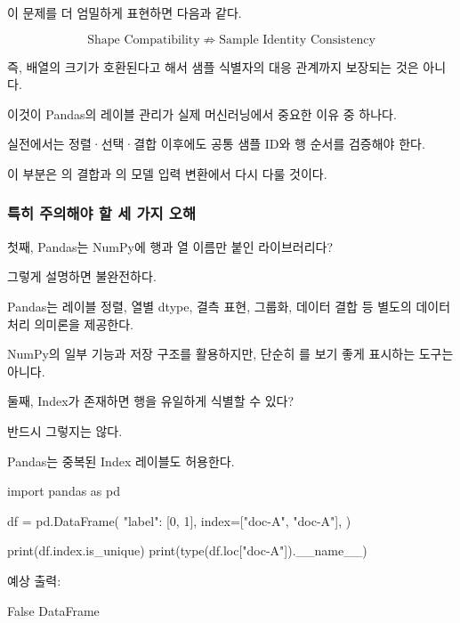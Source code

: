 이 문제를 더 엄밀하게 표현하면 다음과 같다.

\[
\text{Shape Compatibility}
\;\not\Rightarrow\;
\text{Sample Identity Consistency}
\]

즉, 배열의 크기가 호환된다고 해서 샘플 식별자의 대응 관계까지 보장되는 것은 아니다.

이것이 Pandas의 레이블 관리가 실제 머신러닝에서 중요한 이유 중 하나다.

실전에서는 정렬·선택·결합 이후에도 공통 샘플 ID와 행 순서를 검증해야 한다.

이 부분은 의 결합과 의 모델 입력 변환에서 다시 다룰 것이다.

\subsubsection{특히 주의해야 할 세 가지 오해}

\begin{dhknote}
\begin{dhksmry}[centered]
첫째, Pandas는 NumPy에 행과 열 이름만 붙인 라이브러리다?
\end{dhksmry}
\end{dhknote}

그렇게 설명하면 불완전하다.

Pandas는 레이블 정렬, 열별 dtype, 결측 표현, 그룹화, 데이터 결합 등 별도의 데이터 처리 의미론을 제공한다.

NumPy의 일부 기능과 저장 구조를 활용하지만, 단순히 를 보기 좋게 표시하는 도구는 아니다.

\begin{dhknote}
\begin{dhksmry}[centered]
둘째, Index가 존재하면 행을 유일하게 식별할 수 있다?
\end{dhksmry}
\end{dhknote}

반드시 그렇지는 않다.

Pandas는 중복된 Index 레이블도 허용한다.

\begin{dhkcode}
import pandas as pd

df = pd.DataFrame(
    {"label": [0, 1]},
    index=["doc-A", "doc-A"],
)

print(df.index.is_unique)
print(type(df.loc["doc-A"]).__name__)
\end{dhkcode}

예상 출력:

\begin{dhkzsh}
False
DataFrame
\end{dhkzsh}

